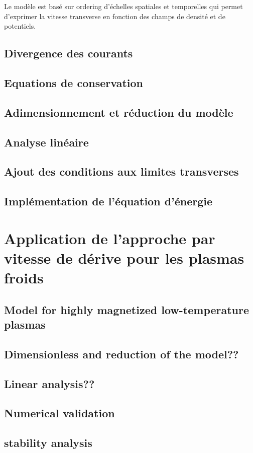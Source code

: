 Le modèle est basé sur ordering d'échelles spatiales et temporelles qui permet d'exprimer 
la vitesse transverse en fonction des champs de densité et de potentiels.

		
		\subsection{Divergence des courants}
		\subsection{Equations de conservation}
		\subsection{Adimensionnement et réduction du modèle}
		\subsection{Analyse linéaire}
		\subsection{Ajout des conditions aux limites transverses}
		\subsection{Implémentation de l'équation d'énergie}
	\section{Application de l'approche par vitesse de dérive pour les plasmas froids}
		\subsection{Model for highly magnetized low-temperature plasmas}
		\subsection{Dimensionless and reduction of the model??}
		\subsection{Linear analysis??}
		\subsection{Numerical validation}
		\subsection{stability analysis}
